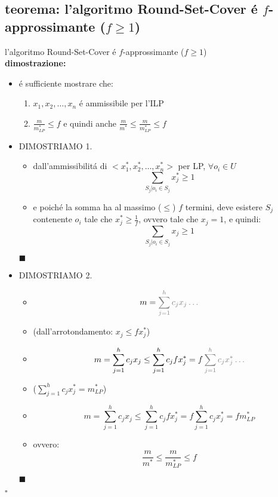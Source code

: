 \subsection*{teorema: l'algoritmo Round-Set-Cover \'e $f$-approssimante ($f\geq 1$)}
\begin{flushleft}
	l'algoritmo Round-Set-Cover \'e $f$-approssimante ($f\geq 1$) \newline \\
	\textbf{dimostrazione:}
	\begin{itemize}
		\item \'e sufficiente mostrare che:
		\begin{enumerate}
			\item $x_1,x_2,\ldots,x_n$ \'e ammissibile per l'ILP
			\item $\frac{m}{m_{LP}^*}\leq f$ e quindi anche $\frac{m}{m^*}\leq\frac{m}{m_{LP}^*}\leq f$
		\end{enumerate}
		\item DIMOSTRIAMO 1.
		\begin{itemize}
			\item dall'ammissibilit\'a di $<x_1^*,x_2^*,\ldots,x_n^*>$ per LP, $\forall o_i\in U$
				$$\sum_{S_j\vert o_i\in S_j}x_j^*\geq 1$$
			\item e poich\'e la somma ha al massimo ($\leq$) $f$ termini, deve esistere $S_j$ contenente $o_i$ tale che $x_j^*\geq\frac{1}{f}$, ovvero tale che $x_j=1$, e quindi:
				$$\sum_{S_j\vert o_i\in S_j}x_j\geq 1$$
		\end{itemize}
		\hfill$\blacksquare$
		\item DIMOSTRIAMO 2.
		\begin{itemize}
			\item[] $$m=\color{gray}\sum_{j=1}^hc_jx_j\ldots$$
			\item (dall'arrotondamento: $x_j\leq fx_j^*$)
			\item[] $$m=\sum_{j=1}^hc_jx_j\leq\sum_{j=1}^hc_jfx_j^*=f\color{gray}\sum_{j=1}^hc_jx_j^*\ldots$$
			\item ($\sum_{j=1}^hc_jx_j^*=m_{LP}^*$)
			\item[] $$m=\sum_{j=1}^hc_jx_j\leq\sum_{j=1}^hc_jfx_j^*=f\sum_{j=1}^hc_jx_j^*=fm_{LP}^*$$
			\item ovvero:
				$$\frac{m}{m^*}\leq\frac{m}{m_{LP}^*}\leq f$$
		\end{itemize}
		\hfill$\blacksquare$
	\end{itemize}
	\hfill$\square$
\end{flushleft}


\newpage
